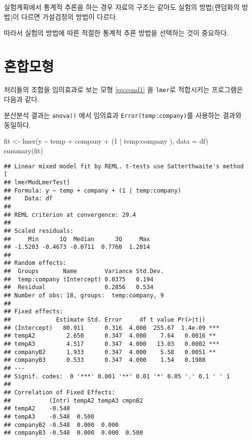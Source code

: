 \documentclass[
]{book}
\makeatletter
\newenvironment{Shaded}{\begin{snugshade}}{\end{snugshade}}
\newcommand{\AttributeTok}[1]{\textcolor[rgb]{0.77,0.63,0.00}{#1}}
\newcommand{\DecValTok}[1]{\textcolor[rgb]{0.00,0.00,0.81}{#1}}
\newcommand{\FunctionTok}[1]{\textcolor[rgb]{0.00,0.00,0.00}{#1}}
\newcommand{\NormalTok}[1]{#1}
\newcommand{\OtherTok}[1]{\textcolor[rgb]{0.56,0.35,0.01}{#1}}
\newcommand{\SpecialCharTok}[1]{\textcolor[rgb]{0.00,0.00,0.00}{#1}}
\newenvironment{kframe}{%
\medskip{}
\setlength{\fboxsep}{.8em}
 \def\at@end@of@kframe{}%
 \ifinner\ifhmode%
  \def\at@end@of@kframe{\end{minipage}}%
  \begin{minipage}{\columnwidth}%
 \fi\fi%
 \def\FrameCommand##1{\hskip\@totalleftmargin \hskip-\fboxsep
 \colorbox{shadecolor}{##1}\hskip-\fboxsep
     \hskip-\linewidth \hskip-\@totalleftmargin \hskip\columnwidth}%
 \MakeFramed {\advance\hsize-\width
   \@totalleftmargin\z@ \linewidth\hsize
   \@setminipage}}%
 {\par\unskip\endMakeFramed%
 \at@end@of@kframe}
\newenvironment{rmdblock}[1]
  {
  \begin{itemize}
  \renewcommand{\labelitemi}{
    \raisebox{-.7\height}[0pt][0pt]{
      {\setkeys{Gin}{width=3em,keepaspectratio}\texttt{[image: images/\#1]}}
    }
  }
  \setlength{\fboxsep}{1em}
  \begin{kframe}
  \item
  }
  {
  \end{kframe}
  \end{itemize}
  }
\newenvironment{rmdcaution}
  {\begin{rmdblock}{caution}}
  {\end{rmdblock}}
\makeatother
\begin{document}
\begin{rmdcaution}
실험계획에서 통계적 추론을 하는 경우 자료의 구조는 같아도 실험의 방법(랜덤화의 방법)이 다르면 가설검정의 방법이 다르다.

따라서 실험의 방법에 따른 적절한 통계적 추론 방법을 선택하는 것이 중요하다.
\end{rmdcaution}

\hypertarget{uxd63cuxd569uxbaa8uxd615-1}{%
\section{혼합모형}\label{uxd63cuxd569uxbaa8uxd615-1}}

처리들의 조합을 임의효과로 보는 모형 \eqref{eq:cond1} 을 \texttt{lmer}로 적합시키는 프로그램은 다음과 같다.

분산분석 결과는 \texttt{anova()} 에서 임의효과 \texttt{Error(temp:company)}를 사용하는 결과와 동일하다.

\begin{Shaded}
\begin{Highlighting}[]
\NormalTok{fit }\OtherTok{\textless{}{-}} \FunctionTok{lmer}\NormalTok{(y }\SpecialCharTok{\textasciitilde{}}\NormalTok{ temp }\SpecialCharTok{+}\NormalTok{ company }\SpecialCharTok{+}\NormalTok{ (}\DecValTok{1} \SpecialCharTok{|}\NormalTok{ temp}\SpecialCharTok{:}\NormalTok{company ), }\AttributeTok{data =}\NormalTok{ df)}
\FunctionTok{summary}\NormalTok{(fit)}
\end{Highlighting}
\end{Shaded}

\begin{verbatim}
## Linear mixed model fit by REML. t-tests use Satterthwaite's method [
## lmerModLmerTest]
## Formula: y ~ temp + company + (1 | temp:company)
##    Data: df
## 
## REML criterion at convergence: 29.4
## 
## Scaled residuals: 
##     Min      1Q  Median      3Q     Max 
## -1.5203 -0.4673 -0.0711  0.7760  1.2014 
## 
## Random effects:
##  Groups       Name        Variance Std.Dev.
##  temp:company (Intercept) 0.0375   0.194   
##  Residual                 0.2856   0.534   
## Number of obs: 18, groups:  temp:company, 9
## 
## Fixed effects:
##             Estimate Std. Error     df t value Pr(>|t|)    
## (Intercept)   80.911      0.316  4.000  255.67  1.4e-09 ***
## tempA2         2.650      0.347  4.000    7.64   0.0016 ** 
## tempA3         4.517      0.347  4.000   13.03   0.0002 ***
## companyB2      1.933      0.347  4.000    5.58   0.0051 ** 
## companyB3      0.533      0.347  4.000    1.54   0.1988    
## ---
## Signif. codes:  0 '***' 0.001 '**' 0.01 '*' 0.05 '.' 0.1 ' ' 1
## 
## Correlation of Fixed Effects:
##           (Intr) tempA2 tempA3 cmpnB2
## tempA2    -0.548                     
## tempA3    -0.548  0.500              
## companyB2 -0.548  0.000  0.000       
## companyB3 -0.548  0.000  0.000  0.500
\end{verbatim}
\end{document}
